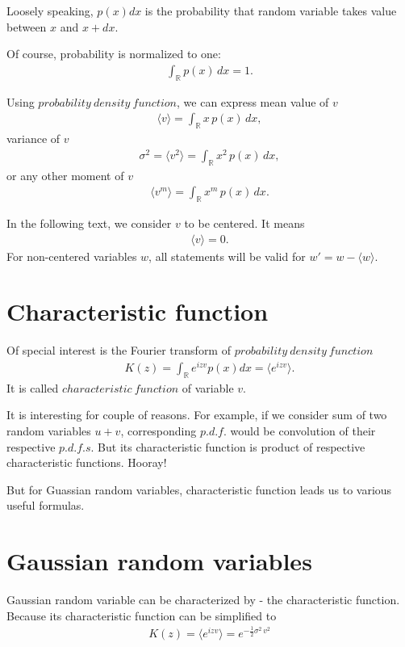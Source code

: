 Loosely speaking, $p(x)dx$ is the probability that random variable takes value between $x$ and $x+dx$.

Of course, probability is normalized to one:
\begin{align}
\int_{\mathbb{R}} p(x) \, dx = 1.
\end{align}

Using $probability~density~function$, we can express mean value of $v$
\begin{align}
\langle v \rangle = \int_{\mathbb{R}} x \, p(x) \, dx ,
\end{align}
variance of $v$
\begin{align}
\sigma^2 = \langle v^2 \rangle = \int_{\mathbb{R}} x^2 \, p(x) \, dx ,
\end{align}
or any other moment of $v$
\begin{align}
\langle v^m \rangle = \int_{\mathbb{R}} x^m \, p(x) \, dx.
\end{align}

In the following text, we consider $v$ to be centered. It means
\begin{align*}
\langle v \rangle = 0.
\end{align*}
For non-centered variables $w$, all statements will be valid for $w' = w - \langle w \rangle$.

\section{Characteristic function}

Of special interest is the Fourier transform of $probability~density~function$
\begin{align*}
K(z) = \int_{\mathbb{R}} e^{izv} p(x) dx = \langle e^{izv} \rangle.
\end{align*}
It is called $characteristic~function$ of variable $v$.

It is interesting for couple of reasons. For example, if we consider sum of two random variables $u+v$, corresponding $p.d.f.$ would be convolution of their respective $p.d.f.s$. But its characteristic function is product of respective characteristic functions. Hooray!

\bigskip

But for Guassian random variables, characteristic function leads us to various useful formulas.

\section{Gaussian random variables}
Gaussian random variable can be characterized by - the characteristic function.
Because its characteristic function can be simplified to
\begin{align*}
K(z) = \langle e^{izv} \rangle = e^{-\frac{1}{2} \sigma^2 \, v^2}
\end{align*}


